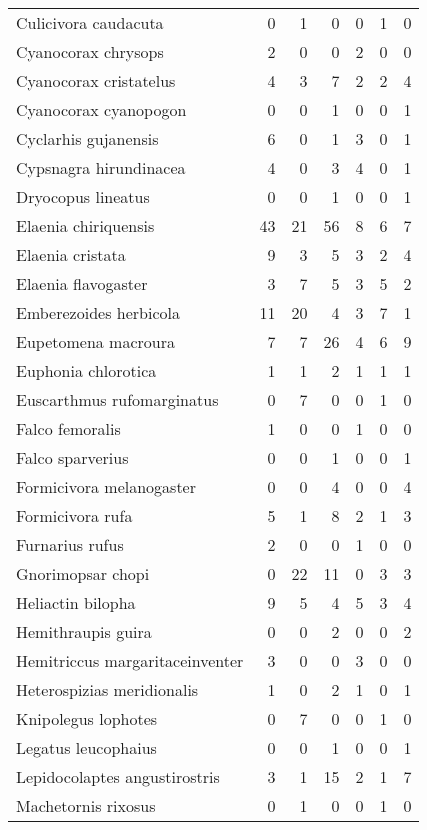 \begin{table}
\begin{tabular}{lrrrrrr}
    Culicivora caudacuta & 0 & 1 & 0 & 0 & 1 & 0 \\ 
    Cyanocorax chrysops & 2 & 0 & 0 & 2 & 0 & 0 \\ 
    Cyanocorax cristatelus & 4 & 3 & 7 & 2 & 2 & 4 \\ 
    Cyanocorax cyanopogon & 0 & 0 & 1 & 0 & 0 & 1 \\ 
    Cyclarhis gujanensis & 6 & 0 & 1 & 3 & 0 & 1 \\ 
    Cypsnagra hirundinacea & 4 & 0 & 3 & 4 & 0 & 1 \\ 
    Dryocopus lineatus & 0 & 0 & 1 & 0 & 0 & 1 \\ 
    Elaenia chiriquensis & 43 & 21 & 56 & 8 & 6 & 7 \\ 
    Elaenia cristata & 9 & 3 & 5 & 3 & 2 & 4 \\ 
    Elaenia flavogaster & 3 & 7 & 5 & 3 & 5 & 2 \\ 
    Emberezoides herbicola & 11 & 20 & 4 & 3 & 7 & 1 \\ 
    Eupetomena macroura & 7 & 7 & 26 & 4 & 6 & 9 \\ 
    Euphonia chlorotica & 1 & 1 & 2 & 1 & 1 & 1 \\ 
    Euscarthmus rufomarginatus & 0 & 7 & 0 & 0 & 1 & 0 \\ 
    Falco femoralis & 1 & 0 & 0 & 1 & 0 & 0 \\ 
    Falco sparverius & 0 & 0 & 1 & 0 & 0 & 1 \\ 
    Formicivora melanogaster & 0 & 0 & 4 & 0 & 0 & 4 \\ 
    Formicivora rufa & 5 & 1 & 8 & 2 & 1 & 3 \\ 
    Furnarius rufus & 2 & 0 & 0 & 1 & 0 & 0 \\ 
    Gnorimopsar chopi & 0 & 22 & 11 & 0 & 3 & 3 \\ 
    Heliactin bilopha & 9 & 5 & 4 & 5 & 3 & 4 \\ 
    Hemithraupis guira & 0 & 0 & 2 & 0 & 0 & 2 \\ 
    Hemitriccus margaritaceinventer & 3 & 0 & 0 & 3 & 0 & 0 \\ 
    Heterospizias meridionalis & 1 & 0 & 2 & 1 & 0 & 1 \\ 
    Knipolegus lophotes & 0 & 7 & 0 & 0 & 1 & 0 \\ 
    Legatus leucophaius & 0 & 0 & 1 & 0 & 0 & 1 \\ 
    Lepidocolaptes angustirostris & 3 & 1 & 15 & 2 & 1 & 7 \\ 
    Machetornis rixosus & 0 & 1 & 0 & 0 & 1 & 0 \\ 

\end{tabular}
\end{table}
